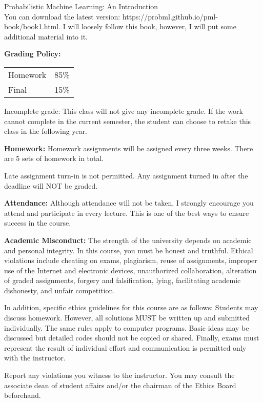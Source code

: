 \documentclass[a4paper,10pt]{article}
\begin{document}
Probabilistic Machine Learning: An Introduction \\
You can download the latest version: https://probml.github.io/pml-book/book1.html. 
 I will loosely follow this book, however, I will put some additional material into it. 


\textbf{Grading Policy:}

\begin{tabular}{lr}
Homework & 85\%\\
Final          & 15\% 
\end{tabular}


Incomplete grade: This class will not give any
incomplete grade. If the work cannot complete in the
current semester, the student can choose to retake this
class in the following year.






\textbf{Homework:} Homework assignments will be assigned every three weeks. There are 5 sets of homework in total. 

Late assignment turn-in is not permitted. Any assignment turned in after the deadline will NOT be graded.




\textbf{Attendance:} Although attendance will not be taken, I strongly encourage you attend and participate in every lecture. This is one of the best ways to ensure success in the course.






\textbf{Academic Misconduct:} The strength of the university depends on academic and personal integrity. In this course, you must be honest 
and truthful. Ethical violations include cheating on exams, plagiarism, reuse of assignments, improper use 
of the Internet and electronic devices, unauthorized collaboration, alteration of graded assignments, forgery 
and falsification, lying, facilitating academic dishonesty, and unfair competition.

In addition, specific ethics guidelines for this course are as follows: Students may discuss homework. However, 
all solutions MUST be written up and submitted individually. The same rules apply to computer programs. 
Basic ideas may be discussed but detailed codes should not be copied or shared. Finally, exams must 
represent the result of individual effort and communication is permitted only with the instructor.

Report any violations you witness to the instructor. You may consult the associate dean of student affairs 
and/or the chairman of the Ethics Board beforehand. 
\end{document}
